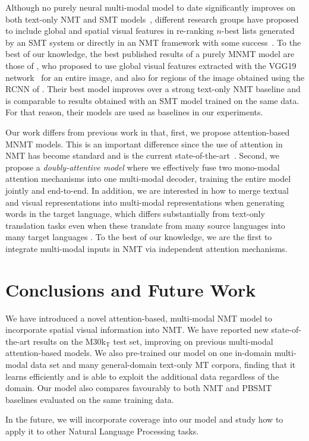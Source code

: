 \documentclass[11pt]{article}
\begin{document}
Although no purely neural multi-modal model to date significantly improves on both text-only NMT and SMT models~\cite{Speciaetal2016}, different research groups have proposed to include global and spatial visual features in re-ranking $n$-best lists generated by an SMT system or directly in an NMT framework with some success~\cite{Caglayanetal2016,CalixtoElliottFrank2016,Huangetal2016,Libovickyetal2016,Shahetal2016}.
To the best of our knowledge, the best published results of a purely MNMT model are those of , who proposed to use global visual features extracted with the VGG19 network~\cite{SimonyanZisserman2014} for an entire image, and also for regions of the image obtained using the RCNN of .
Their best model improves over a strong text-only NMT baseline and is comparable to results obtained with an SMT model trained on the same data.
For that reason, their models are used as baselines in our experiments.

Our work differs from previous work in that, first, we propose attention-based MNMT models.
This is an important difference since the use of attention in NMT has become standard and is the current state-of-the-art~\cite{Jeanetal2015,Luongetal2015,Firatetal2016,Sennrichetal2016}.
Second, we propose a \emph{doubly-attentive model} where we effectively fuse two mono-modal attention mechanisms into one multi-modal decoder, training the entire model jointly and end-to-end.
In addition, we are interested in how to merge textual and visual representations into multi-modal representations when generating words in the target language, which differs substantially from text-only translation tasks even when these translate from many source languages into many target languages \cite{Dongetal2015,Firatetal2016}.
To the best of our knowledge, we are the first to integrate multi-modal inputs in NMT via independent attention mechanisms.


\section{Conclusions and Future Work}\label{sec:conclusions}

We have introduced a novel attention-based, multi-modal NMT model to incorporate spatial visual information into NMT.
We have reported new state-of-the-art results on the M30k$_\text{T}$ test set, improving on previous multi-modal attention-based models.
We also pre-trained our model on one in-domain multi-modal data set and many general-domain text-only MT corpora, finding that it learns efficiently and is able to exploit the additional data regardless of the domain.
Our model also compares favourably to both NMT and PBSMT baselines evaluated on the same training data.

In the future, we will incorporate coverage into our model and study how to apply it to other Natural Language Processing tasks.




\end{document}
